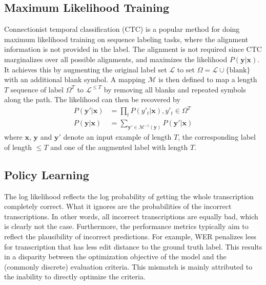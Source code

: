 \documentclass{article}
\begin{document}
\subsection{Maximum Likelihood Training}
Connectionist temporal classification (CTC) \cite{graves2006ctc}
is a popular method for doing maximum likelihood training on sequence labeling tasks, where the alignment information is not provided in the label. The alignment is not required since CTC marginalizes over all possible alignments, and maximizes the likelihood $P(\mathbf{y}|\mathbf{x})$. It achieves this by augmenting the original label set $\mathcal{L}$ to set $\Omega = \mathcal{L} \cup \{\text{blank}\}$ with an additional blank symbol. A mapping $\mathcal{M}$ is then defined to map a length $T$ sequence of label $\Omega^T$ to $\mathcal{L}^{\le T}$ by removing all blanks and repeated symbols along the path. The likelihood can then be recovered by 
\begin{align*}
P(\mathbf{y}' | \mathbf{x}) &= \prod_t P( y'_t | \mathbf{x}), y'_t \in \Omega^T \\
P(\mathbf{y}|\mathbf{x}) &= \sum_{\mathbf{y}' \in \mathcal{M}^{-1}(\mathbf{y})} P(\mathbf{y}' | \mathbf{x})
\end{align*}
where $\mathbf{x}$, $\mathbf{y}$ and $\mathbf{y}'$ denote an input example of length $T$, the corresponding label of length $\le T$ and one of the augmented label with length $T$.



\subsection{Policy Learning}
The log likelihood reflects the log probability of getting the whole transcription completely correct. What it ignores are the probabilities of the incorrect transcriptions. In other words, all incorrect transcriptions are equally bad, which is clearly not the case. Furthermore, the performance metrics typically aim to reflect the plausibility of incorrect predictions. For example, WER penalizes less for transcription that has less edit distance to the ground truth label.
This results in a disparity between the optimization objective of the model and the (commonly discrete) evaluation criteria. This mismatch is mainly attributed to the inability to directly optimize the criteria.
\end{document}
